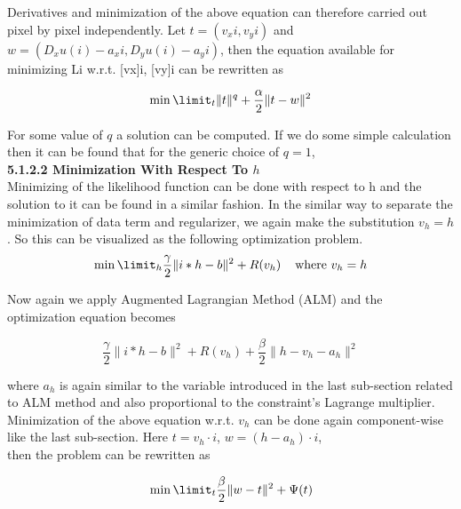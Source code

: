 \documentclass{article}
\begin{document}
Derivatives and minimization of the above equation can therefore carried out pixel by pixel independently.  Let $t = (v_xi, v_yi)$ and $w = (D_xu(i) − a_xi, D_yu(i) − a_yi)$, then the equation available for minimizing Li  w.r.t. [vx]i, [vy]i can be rewritten as

\begin{equation}
    \min\limit_{t} \|t\|^q + \frac{\alpha}{2} \|t - w\|^2
\end{equation}

For some value of $q$ a solution can be computed. If we do some simple calculation then it can be found that for the generic choice of $q = 1$, \\

\textbf{5.1.2.2 Minimization With Respect To $h$} \\

Minimizing of the likelihood function can be done with respect to h and the solution to it can be found in a similar fashion. In the similar way to separate the minimization of data term and regularizer, we again make the substitution $v_h = h$. So this can be visualized as the following optimization problem. \\

\begin{equation}
    \min\limit_{h} \frac{\gamma}{2} \|i * h - b\|^2 + R(v_h) \hspace{.4cm} \text{where $v_h = h$}
\end{equation}

Now again we apply Augmented Lagrangian Method (ALM) and the optimization equation becomes

\begin{equation}
    \frac{\gamma}{2} \|i * h - b\|^2 + R(v_h) + \frac{\beta}{2} \|h - v_h - a_h\|^2
\end{equation}

where $a_h$ is again similar to the variable introduced in the last sub-section related to ALM method and also  proportional to the constraint’s Lagrange multiplier. Minimization of the above equation w.r.t. $v_h$ can be done again component-wise like the last sub-section. Here $t = v_h \cdot i$, $w = (h − a_h) \cdot i$, \\

then the problem can be rewritten as 

\begin{equation}
    \min\limit_{t} \frac{\beta}{2} \|w - t\|^2 + \Psi(t)
\end{equation}
\end{document}

